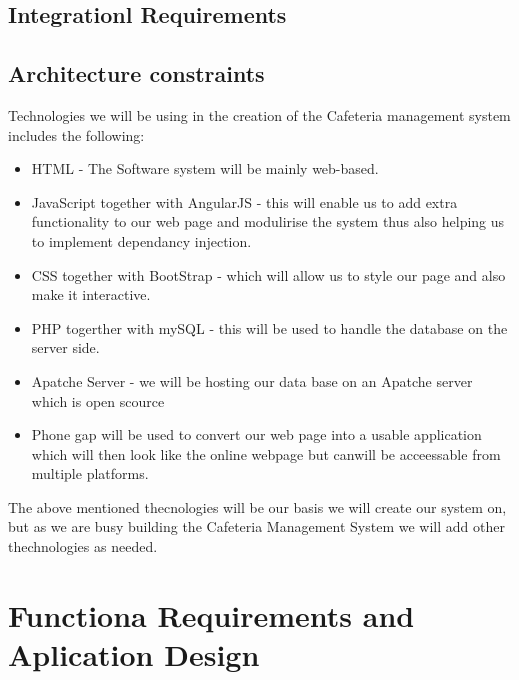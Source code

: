 \documentclass[12pt]{article}
\begin{document}
\subsection{Integrationl Requirements}

\subsection{Architecture constraints}
Technologies we will be using  in the creation of the Cafeteria management system includes the following: 

\begin{itemize}
  \item HTML - The Software system will be mainly web-based.

  \item JavaScript together with AngularJS - this will enable us to add extra functionality to our web page and modulirise the 	 	system thus also helping us to implement dependancy injection.

 \item CSS together with BootStrap - which will allow us to style our page and also make it interactive.

 \item PHP togerther with mySQL - this will be used to handle the database on the server side.

 \item Apatche Server - we will be hosting our data base on an Apatche server which is open scource

 \item Phone gap will be used to convert our web page into a usable application which will then look like the online webpage but canwill be acceessable from multiple platforms.

\end{itemize}
The above mentioned thecnologies will be our basis we will create our system on, but as we are busy building the Cafeteria Management System we will add other thechnologies as needed. 


\section{Functiona Requirements and Aplication Design}
\end{document}
